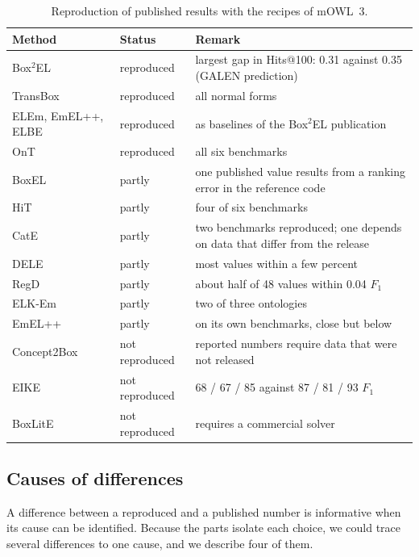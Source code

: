 \documentclass[runningheads]{llncs}
\begin{document}
\begin{table}[t]
\caption{Reproduction of published results with the recipes of mOWL~3.}\label{tab:reproduction}
\centering\footnotesize\setlength{\tabcolsep}{4pt}
\begin{tabular}{@{}p{3.0cm}p{1.6cm}p{6.9cm}@{}}
\toprule
Method & Status & Remark \\
\midrule
Box$^2$EL~\cite{jackermeier2024} & reproduced & largest gap in Hits@100: 0.31 against 0.35 (GALEN prediction) \\
TransBox~\cite{yang2025} & reproduced & all normal forms \\
ELEm, EmEL++, ELBE & reproduced & as baselines of the Box$^2$EL publication \\
OnT~\cite{yang2025ont} & reproduced & all six benchmarks \\
BoxEL~\cite{xiong2022} & partly & one published value results from a ranking error in the reference code \\
HiT~\cite{he2024hit} & partly & four of six benchmarks \\
CatE~\cite{zhapa2023} & partly & two benchmarks reproduced; one depends on data that differ from the release \\
DELE~\cite{mashkova2024} & partly & most values within a few percent \\
RegD~\cite{yang2025regd} & partly & about half of 48 values within 0.04 $F_1$ \\
ELK-Em~\cite{singh2026} & partly & two of three ontologies \\
EmEL++~\cite{mondal2021} & partly & on its own benchmarks, close but below \\
Concept2Box~\cite{huang2023} & not reproduced & reported numbers require data that were not released \\
EIKE~\cite{wang2024eike} & not reproduced & 68 / 67 / 85 against 87 / 81 / 93 $F_1$ \\
BoxLitE~\cite{lourenco2026} & not reproduced & requires a commercial solver \\
\bottomrule
\end{tabular}
\end{table}

\subsection{Causes of differences}

A difference between a reproduced and a published number is informative when its cause
can be identified. Because the parts isolate each choice, we could trace several
differences to one cause, and we describe four of them.
\end{document}
